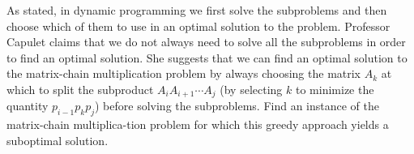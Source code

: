 As stated, in dynamic programming we first solve the subproblems and then 
choose which of them  to use in an optimal solution to the problem. 
Professor Capulet claims that we do not always need to solve all the subproblems 
in order to find an optimal solution. She suggests that we can find an optimal 
solution to the matrix-chain multiplication problem by always choosing the 
matrix $A_k$ at which to split the subproduct $A_iA_{i+1}\cdots A_j$
(by selecting $k$ to minimize the quantity $p_{i-1}p_kp_j$) before solving the 
subproblems. Find an instance of the matrix-chain multiplica-tion problem 
for which this greedy approach yields a suboptimal solution.